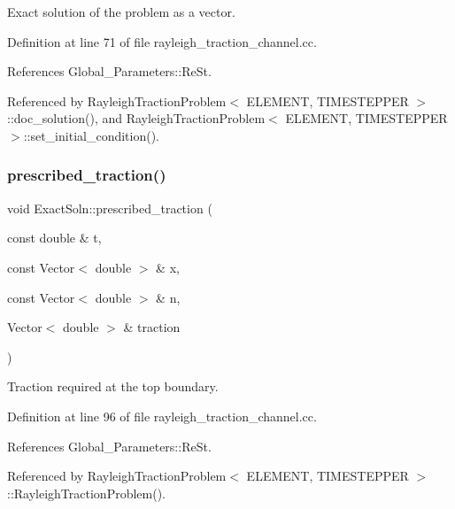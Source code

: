 Exact solution of the problem as a vector. 



Definition at line 71 of file rayleigh\+\_\+traction\+\_\+channel.\+cc.



References Global\+\_\+\+Parameters\+::\+Re\+St.



Referenced by Rayleigh\+Traction\+Problem$<$ E\+L\+E\+M\+E\+N\+T, T\+I\+M\+E\+S\+T\+E\+P\+P\+E\+R $>$\+::doc\+\_\+solution(), and Rayleigh\+Traction\+Problem$<$ E\+L\+E\+M\+E\+N\+T, T\+I\+M\+E\+S\+T\+E\+P\+P\+E\+R $>$\+::set\+\_\+initial\+\_\+condition().

\mbox{\label{namespaceExactSoln_a2a77269d59d7cf56364f0c3b5ae13b41}} 
\subsubsection{\texorpdfstring{prescribed\+\_\+traction()}{prescribed\_traction()}}
{\footnotesize\ttfamily void Exact\+Soln\+::prescribed\+\_\+traction (\begin{DoxyParamCaption}\item[{const double \&}]{t,  }\item[{const Vector$<$ double $>$ \&}]{x,  }\item[{const Vector$<$ double $>$ \&}]{n,  }\item[{Vector$<$ double $>$ \&}]{traction }\end{DoxyParamCaption})}



Traction required at the top boundary. 



Definition at line 96 of file rayleigh\+\_\+traction\+\_\+channel.\+cc.



References Global\+\_\+\+Parameters\+::\+Re\+St.



Referenced by Rayleigh\+Traction\+Problem$<$ E\+L\+E\+M\+E\+N\+T, T\+I\+M\+E\+S\+T\+E\+P\+P\+E\+R $>$\+::\+Rayleigh\+Traction\+Problem().

